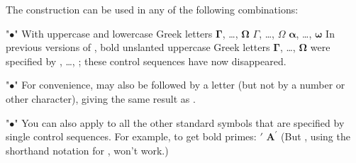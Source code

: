\medskip
The  construction can be used in any of the following
combinations:
\roster
\item"$\bullet$" With uppercase and lowercase Greek letters
\beginexample{\exboxwidth=3.75in}
        $\boldsymbol\Gamma$, \dots, $\boldsymbol\Omega$
        $\boldsymbol\varGamma$, \dots, $\boldsymbol\varOmega$
        $\boldsymbol\alpha$, \dots, $\boldsymbol\omega$
\endexample
\noindent
In previous versions of \AmSTeX, bold unslanted uppercase Greek letters
$\boldsymbol\Gamma$, \dots, $\boldsymbol\Omega$ were specified by
, \dots, ; these control sequences have now
disappeared. 

\medskip
\item"$\bullet$"
For convenience,  may also be followed by a letter (but
not by a number or other character), giving the same result as
.
  
\medskip
\item"$\bullet$"
You can also apply  to all the other standard symbols that
are specified by single control sequences. For example, to get bold primes:
\beginexample{\exboxwidth=3.75in}
\exbox{}{\$\\boldsymbol\\prime\$} $\boldsymbol\prime$
        $\boldsymbol A^{\boldsymbol\prime}$
\endexample
\noindent
(But , using the shorthand notation for ,
won't work.)


